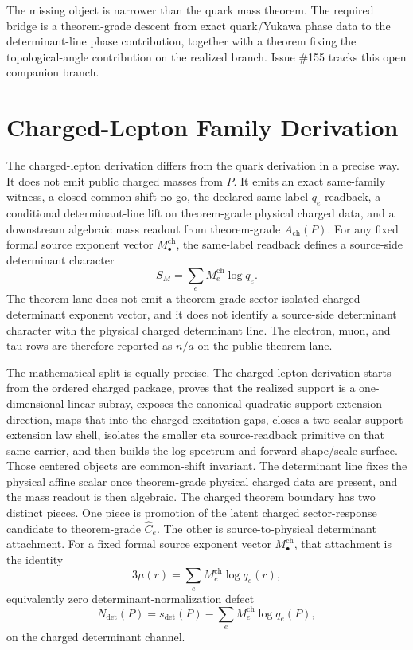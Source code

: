 \documentclass[11pt]{article}
\begin{document}
The missing object is narrower than the quark mass theorem. The required bridge is a
theorem-grade descent from exact quark/Yukawa phase data to the determinant-line phase
contribution, together with a theorem fixing the topological-angle contribution on the realized
branch. Issue \#155 tracks this open companion branch.

\section{Charged-Lepton Family Derivation}

The charged-lepton derivation differs from the quark derivation in a precise way. It does not emit public charged masses from \(P\). It emits an exact same-family witness, a closed common-shift no-go, the declared same-label \(q_e\) readback, a conditional determinant-line lift on theorem-grade physical charged data, and a downstream algebraic mass readout from theorem-grade \(A_{\mathrm{ch}}(P)\). For any fixed formal source exponent vector \(M_\bullet^{\mathrm{ch}}\), the same-label readback defines a source-side determinant character
\[
S_M=\sum_e M_e^{\mathrm{ch}}\log q_e.
\]
The theorem lane does not emit a theorem-grade sector-isolated charged determinant exponent vector, and it does not identify a source-side determinant character with the physical charged determinant line. The electron, muon, and tau rows are therefore reported as \(n/a\) on the public theorem lane.

The mathematical split is equally precise. The charged-lepton derivation starts from
the ordered charged package, proves that the realized support is a one-dimensional linear subray,
exposes the canonical quadratic support-extension direction, maps that into the charged
excitation gaps, closes a two-scalar support-extension law shell, isolates the smaller eta
source-readback primitive on that same carrier, and then builds the log-spectrum and forward
shape/scale surface. Those centered objects are common-shift invariant. The determinant line fixes the physical affine scalar once theorem-grade physical charged data are present, and the mass readout is then algebraic. The charged theorem boundary has two distinct pieces. One piece is promotion of the latent charged sector-response candidate to theorem-grade \(\widehat C_e\). The other is source-to-physical determinant attachment. For a fixed formal source exponent vector \(M_\bullet^{\mathrm{ch}}\), that attachment is the identity
\[
3\mu(r)=\sum_e M_e^{\mathrm{ch}}\log q_e(r),
\]
equivalently zero determinant-normalization defect
\[
N_{\det}(P)=s_{\det}(P)-\sum_e M_e^{\mathrm{ch}}\log q_e(P),
\]
on the charged determinant channel.
\end{document}
